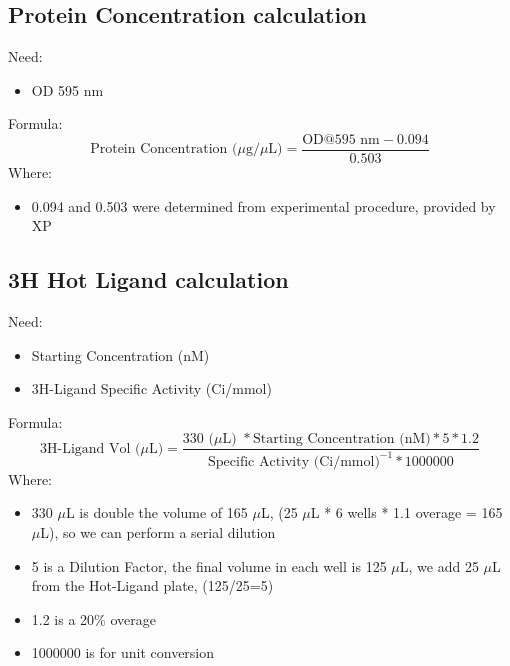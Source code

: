 \documentclass[12pt, letterpaper]{article}
\begin{document}
\subsection{Protein Concentration calculation}
Need:
\begin{itemize}
    \item OD \@ 595 nm
\end{itemize}
Formula:
\[\text{Protein Concentration ($\mu$g/$\mu$L)} = \frac{\text{OD@595 nm} - 0.094}{0.503}\]
Where:
\begin{itemize}
    \item 0.094 and 0.503 were determined from experimental procedure, provided by XP
\end{itemize}



\subsection{3H Hot Ligand calculation}
Need: \begin{itemize}
    \item Starting Concentration (nM)
    \item 3H-Ligand Specific Activity (Ci/mmol)
\end{itemize}
Formula:
\[\text{3H-Ligand Vol ($\mu$L)} = \frac{ 330 \text{ ($\mu$L) } * \text{Starting Concentration (nM)} * 5 * 1.2}{ \text{Specific Activity (Ci/mmol)}^{-1} * 1000000}\]
Where:
\begin{itemize}
    \item 330 $\mu$L is double the volume of 165 $\mu$L, (25 $\mu$L * 6 wells * 1.1 overage = 165 $\mu$L), so we can perform a serial dilution
    \item 5 is a Dilution Factor, the final volume in each well is 125 $\mu$L, we add 25 $\mu$L from the Hot-Ligand plate, (125/25=5)
    \item 1.2 is a 20\% overage
    \item 1000000 is for unit conversion
\end{itemize}
\end{document}
